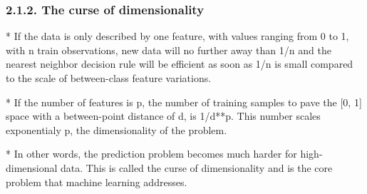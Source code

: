 \subsubsection{2.1.2. The curse of dimensionality}

*   If the data is only described by one feature, with values ranging from 0 to 1, with n train observations, new data will no further away than 1/n and the nearest neighbor decision rule will be efficient as soon as 1/n is small compared to the scale of between-class feature variations.

*   If the number of features is p, the number of training samples to pave the [0, 1] space with a between-point distance of d, is 1/d**p. This number scales exponentialy p, the dimensionality of the problem.

*   In other words, the prediction problem becomes much harder for high-dimensional data. This is called the curse of dimensionality and is the core problem that machine learning addresses.





